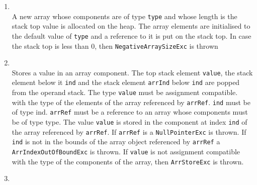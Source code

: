 \begin{itemize}
\begin{enumerate}
	\item  {}\\
		  A new array whose components are of type \texttt{type} and whose length is the stack top value is allocated on the heap.
		  The array elements are initialised to the default value of  \texttt{type} and a reference to it is put on the stack top. 
		  In case the stack top is less than 0, then \texttt{NegativeArraySizeExc} is thrown
 		
		
 		
	
		 

		    
     \item {}\\
		  Stores a value in an array component. 
		  The top stack element \texttt{value}, the stack element below it \texttt{ind} and the stack element \texttt{arrInd}
		  below \texttt{ind} are popped from the operand stack. The type \texttt{value} must be assignment 
		  compatible. with the type
		  of the elements of the array referenced by \texttt{arrRef}. \texttt{ind} must be of type ind. 
		  \texttt{arrRef} must be a reference to an array whose components must be of type \textrm{type}.
		  The value \texttt{value} is stored in the component at index \texttt{ind} of the array referenced by \texttt{arrRef}.  
		  If \texttt{arrRef} is \Mynull a \texttt{NullPointerExc} is thrown. If \texttt{ind}  is not in the bounds of the array 
		  object referenced by \texttt{arrRef}  a \texttt{ArrIndexOutOfBoundExc} is thrown. If \texttt{value} is not assignment 
		  compatible with the type of the components of the array, then \texttt{ArrStoreExc} is thrown.


     \item \arrload
           

\end{enumerate}
\end{itemize}
